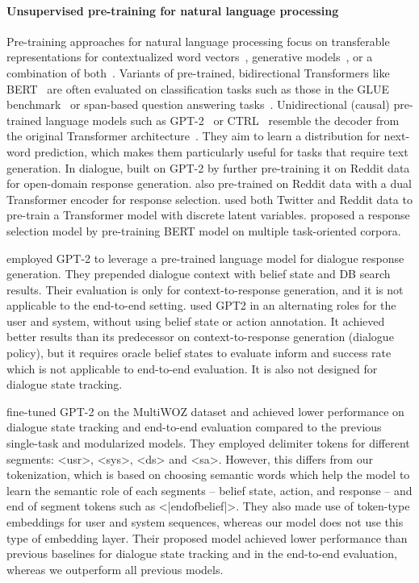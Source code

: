 \documentclass{article}
\begin{document}
\paragraph{Unsupervised pre-training for natural language processing}
Pre-training approaches for natural language processing focus on transferable representations 
for contextualized word vectors~\citep{mccann2017learned,peters2018deep}, 
generative models~\citep{radford2019language,keskar2019ctrl}, 
or a combination of both~\citep{dong2019unified,yang2019xlnet}.
Variants of pre-trained, bidirectional Transformers like BERT~\citep{devlin2018bert} 
are often evaluated on classification tasks such as those in the GLUE benchmark~\citep{wang2018glue} 
or span-based question answering tasks~\citep{rajpurkar2016squad}. 
Unidirectional (causal) pre-trained language models 
such as GPT-2~\citep{radford2019language} or CTRL~\citep{keskar2019ctrl} 
resemble the decoder from the original Transformer architecture~\citep{vaswani2017attention}.
They aim to learn a distribution for next-word prediction, 
which makes them particularly useful for tasks that require text generation.
In dialogue,
\citet{zhang2019dialogpt} built on GPT-2 by further pre-training it on Reddit data 
for open-domain response generation. 
\citet{henderson2019convert} also pre-trained on Reddit data with a dual Transformer encoder 
for response selection. 
\citet{bao2019plato} used both Twitter and Reddit data to pre-train a Transformer model 
with discrete latent variables. 
\citet{wu2020tod} proposed a response selection model 
by pre-training BERT model on multiple task-oriented corpora.


\citet{budzianowski2019hello} employed GPT-2 to leverage a pre-trained language model for dialogue response generation. They prepended dialogue context with belief state and DB search results. Their evaluation is only for context-to-response generation, and it is not applicable to the end-to-end setting. 
\citet{wu2019alternating} used GPT2 in an alternating roles for the user and system, without using belief state or action annotation. It achieved better results than its predecessor on context-to-response generation (dialogue policy), but it requires oracle belief states to evaluate inform and success rate which is not applicable to end-to-end evaluation. It is also not designed for dialogue state tracking.


\citet{ham2020end} fine-tuned GPT-2 on the MultiWOZ dataset and achieved lower performance on dialogue state tracking and end-to-end evaluation compared to the previous single-task and modularized models. They employed delimiter tokens for different segments: <usr>, <sys>, <ds> and <sa>. However, this differs from our tokenization, which is based on choosing semantic words which help the model to learn the semantic role of each segments -- belief state, action, and response -- and end of segment tokens such as <|endofbelief|>. They also made use of token-type embeddings for user and system sequences, whereas our model does not use this type of embedding layer. Their proposed model achieved lower performance than previous baselines for dialogue state tracking and in the end-to-end evaluation, whereas we outperform all previous models. 
\end{document}
